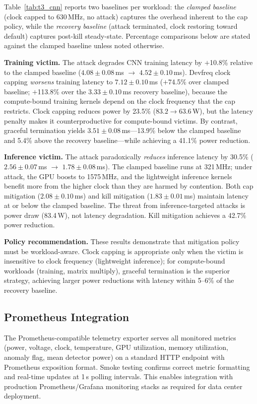 \documentclass[conference]{IEEEtran}
\begin{document}
Table~\ref{tab:t3_cnn} reports two baselines per workload: the
\emph{clamped baseline} (clock capped to 630\,MHz, no attack) captures
the overhead inherent to the cap policy, while the \emph{recovery
baseline} (attack terminated, clock restoring toward default) captures
post-kill steady-state.  Percentage comparisons below are stated
against the clamped baseline unless noted otherwise.

\textbf{Training victim.}  The attack degrades CNN training latency by
$+$10.8\% relative to the clamped baseline ($4.08 \pm 0.08$\,ms
$\to$ $4.52 \pm 0.10$\,ms).  Devfreq clock capping \emph{worsens}
training latency to $7.12 \pm 0.10$\,ms ($+$74.5\% over clamped
baseline; $+$113.8\% over the $3.33 \pm 0.10$\,ms recovery baseline),
because the compute-bound training kernels depend on the clock
frequency that the cap restricts.  Clock capping reduces power by
23.5\% ($83.2 \to 63.6$\,W), but the latency penalty makes it
counterproductive for compute-bound victims.  By contrast, graceful
termination yields $3.51 \pm 0.08$\,ms---13.9\% below the clamped
baseline and 5.4\% above the recovery baseline---while achieving a
41.1\% power reduction.

\textbf{Inference victim.}  The attack paradoxically \emph{reduces}
inference latency by 30.5\% ($2.56 \pm 0.07$\,ms $\to$ $1.78 \pm
0.08$\,ms).  The clamped baseline runs at 321\,MHz; under attack, the
GPU boosts to 1575\,MHz, and the lightweight inference kernels benefit
more from the higher clock than they are harmed by contention.  Both
cap mitigation ($2.08 \pm 0.10$\,ms) and kill mitigation ($1.83 \pm
0.01$\,ms) maintain latency at or below the clamped baseline.  The
threat from inference-targeted attacks is power draw (83.4\,W), not
latency degradation.  Kill mitigation achieves a 42.7\% power
reduction.

\textbf{Policy recommendation.}  These results demonstrate that
mitigation policy must be workload-aware.  Clock capping is appropriate
only when the victim is insensitive to clock frequency (lightweight
inference); for compute-bound workloads (training, matrix multiply),
graceful termination is the superior strategy, achieving larger power
reductions with latency within 5--6\% of the recovery baseline.

\subsection{Prometheus Integration}

The Prometheus-compatible telemetry exporter serves all monitored
metrics (power, voltage, clock, temperature, GPU utilization, memory
utilization, anomaly flag, mean detector power) on a standard HTTP
endpoint with Prometheus exposition format.  Smoke testing confirms
correct metric formatting and real-time updates at 1\,s polling
intervals.  This enables integration with production
Prometheus/Grafana monitoring stacks as required for data center
deployment.
\end{document}
